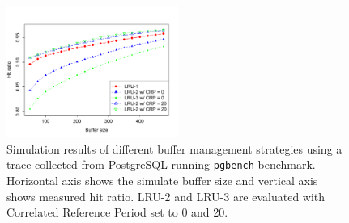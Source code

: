 \begin{figure}[t!]
    \centering
	\includegraphics[width=0.5\textwidth]{./figures/postgres.pdf}
	\caption{Simulation results of different buffer management strategies using a trace collected from PostgreSQL running \texttt{pgbench} benchmark. Horizontal axis shows the simulate buffer size and vertical axis shows measured hit ratio. LRU-2 and LRU-3 are evaluated with Correlated Reference Period set to 0 and 20.}
\end{figure}
